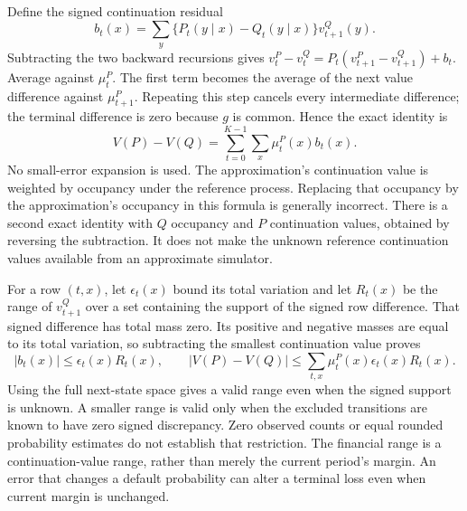 Define the signed continuation residual
\begin{equation}
 b_t(x)=\sum_y\{P_t(y\mid x)-Q_t(y\mid x)\}v^Q_{t+1}(y).
 \label{exec17:s5-occupied-residual}
\end{equation}
Subtracting the two backward recursions gives
$v^P_t-v^Q_t=P_t(v^P_{t+1}-v^Q_{t+1})+b_t$. Average against $\mu^P_t$.
The first term becomes the average of the next value difference against
$\mu^P_{t+1}$. Repeating this step cancels every intermediate difference;
the terminal difference is zero because $g$ is common. Hence the exact identity
is
\begin{equation}
 V(P)-V(Q)=\sum_{t=0}^{K-1}\sum_x\mu^P_t(x)b_t(x).
 \label{exec17:s5-occupied-identity}
\end{equation}
No small-error expansion is used. The approximation's continuation value is
weighted by occupancy under the reference process. Replacing that occupancy
by the approximation's occupancy in this formula is generally incorrect.
There is a second exact identity with $Q$ occupancy and $P$ continuation
values, obtained by reversing the subtraction. It does not make the unknown
reference continuation values available from an approximate simulator.

For a row $(t,x)$, let $\epsilon_t(x)$ bound its total variation and let
$R_t(x)$ be the range of $v^Q_{t+1}$ over a set containing the support of the
signed row difference. That signed difference has total mass zero. Its
positive and negative masses are equal to its total variation, so subtracting
the smallest continuation value proves
\begin{equation}
 |b_t(x)|\leq \epsilon_t(x)R_t(x),\qquad
 |V(P)-V(Q)|\leq
 \sum_{t,x}\mu^P_t(x)\epsilon_t(x)R_t(x).
 \label{exec17:s5-occupied-envelope}
\end{equation}
Using the full next-state space gives a valid range even when the signed
support is unknown. A smaller range is valid only when the excluded
transitions are known to have zero signed discrepancy. Zero observed counts
or equal rounded probability estimates do not establish that restriction.
The financial range is a continuation-value range, rather than merely the
current period's margin. An error that changes a default probability can
alter a terminal loss even when current margin is unchanged.


